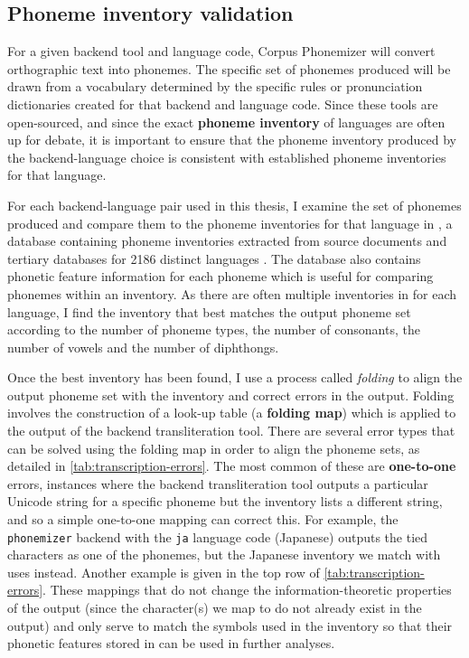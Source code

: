 \subsection{Phoneme inventory validation}
\label{sec:dataset-folding}

For a given backend tool and language code, Corpus Phonemizer will convert orthographic text into phonemes. The specific set of phonemes produced will be drawn from a vocabulary determined by the specific rules or pronunciation dictionaries created for that backend and language code. Since these tools are open-sourced, and since the exact \textbf{phoneme inventory} of languages are often up for debate, it is important to ensure that the phoneme inventory produced by the backend-language choice is consistent with established phoneme inventories for that language.

For each backend-language pair used in this thesis, I examine the set of phonemes produced and compare them to the phoneme inventories for that language in \phoible, a database containing phoneme inventories extracted from source documents and tertiary databases for 2186 distinct languages \citep{phoible}. The database also contains phonetic feature information for each phoneme which is useful for comparing phonemes within an inventory. As there are often multiple inventories in \phoible for each language, I find the inventory that best matches the output phoneme set according to the number of phoneme types, the number of consonants, the number of vowels and the number of diphthongs.

Once the best inventory has been found, I use a process called \emph{folding} to align the output phoneme set with the inventory and correct errors in the output. Folding involves the construction of a look-up table (a \textbf{folding map}) which is applied to the output of the backend transliteration tool. There are several error types that can be solved using the folding map in order to align the phoneme sets, as detailed in \cref{tab:transcription-errors}. The most common of these are \textbf{one-to-one} errors, instances where the backend transliteration tool outputs a particular Unicode string for a specific phoneme but the inventory lists a different string, and so a simple one-to-one mapping can correct this. For example, the \texttt{phonemizer} backend with the \texttt{ja} language code (Japanese) outputs the tied characters  as one of the phonemes, but the Japanese inventory we match with uses  instead. Another example is given in the top row of \cref{tab:transcription-errors}. These mappings that do not change the information-theoretic properties of the output (since the character(s) we map to do not already exist in the output) and only serve to match the symbols used in the inventory so that their phonetic features stored in \phoible can be used in further analyses.

